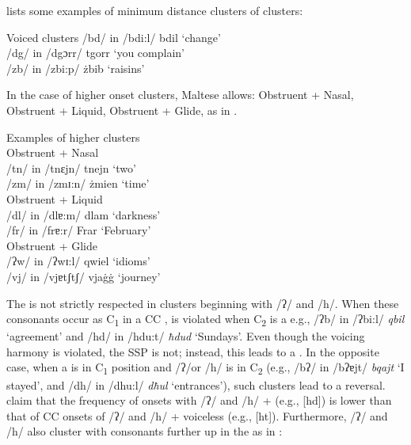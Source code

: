 \documentclass[output=paper]{langsci/langscibook}
\begin{document}
 lists some examples of minimum distance  clusters of   clusters:

\ea\label{ex:galea:2}
{Voiced  clusters}
\ea /bd/ in /bdi:l/ bdil ‘change’\\
\ex /dg/ in /dgɔrr/ tgorr ‘you complain’\\
\ex /zb/ in /zbi:p/ żbib ‘raisins’\\
\z
\z

In the case of higher  onset clusters, Maltese allows: Obstruent + Nasal, Obstruent + Liquid, Obstruent + Glide, as in . 

\newpage 
\ea\label{ex:galea:3}
{Examples of higher  clusters}\\
\ea
{Obstruent + Nasal} \\
/tn/ in /tnɛjn/ tnejn ‘two’\\
/zm/ in /zmɪ:n/ żmien ‘time’\\
\ex
{Obstruent + Liquid} \\
/dl/ in /dlɐ:m/ dlam ‘darkness’\\
  /fr/ in /frɐ:r/ Frar ‘February’\\
\ex
{Obstruent + Glide}\\
/ʔw/ in /ʔwɪ:l/ qwiel ‘idioms’ \\
 /vj/ in /vjɐtʃtʃ/ vja\.g\.g ‘journey’ \\
\z
\z
 
The  is not strictly respected in clusters beginning with /ʔ/ and /h/. When these consonants occur as C\textsubscript{1} in a CC ,  is violated when C\textsubscript{2} is a   e.g., /ʔb/ in /ʔbi:l/ \textit{qbil} ‘agreement’ and /hd/ in /hdu:t/ \textit{ħdud} ‘Sundays’. Even though the voicing harmony is violated, the SSP is not; instead, this leads to a . In the opposite case, when a   is in C\textsubscript{1} position and /ʔ/or /h/ is in C\textsubscript{2} (e.g., /bʔ/ in /bʔɐjt/ \textit{bqajt} ‘I stayed’, and /dh/ in /dhu:l/ \textit{dħul} ‘entrances’), such clusters lead to a  reversal. \citet{maltese_book} claim that the frequency of  onsets with /ʔ/ and /h/ +   (e.g., [hd]) is lower than that of CC onsets of /ʔ/ and /h/ + voiceless  (e.g., [ht]). Furthermore, /ʔ/ and /h/ also cluster with consonants further up in the  as in :
\end{document}
